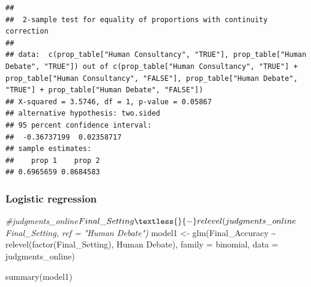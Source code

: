 \documentclass[
]{article}
\newenvironment{Shaded}{\begin{snugshade}}{\end{snugshade}}
\newcommand{\AttributeTok}[1]{\textcolor[rgb]{0.77,0.63,0.00}{#1}}
\newcommand{\CommentTok}[1]{\textcolor[rgb]{0.56,0.35,0.01}{\textit{#1}}}
\newcommand{\FunctionTok}[1]{\textcolor[rgb]{0.00,0.00,0.00}{#1}}
\newcommand{\NormalTok}[1]{#1}
\newcommand{\OtherTok}[1]{\textcolor[rgb]{0.56,0.35,0.01}{#1}}
\newcommand{\SpecialCharTok}[1]{\textcolor[rgb]{0.00,0.00,0.00}{#1}}
\newcommand{\StringTok}[1]{\textcolor[rgb]{0.31,0.60,0.02}{#1}}
\begin{document}
\begin{verbatim}
## 
##  2-sample test for equality of proportions with continuity correction
## 
## data:  c(prop_table["Human Consultancy", "TRUE"], prop_table["Human Debate", "TRUE"]) out of c(prop_table["Human Consultancy", "TRUE"] + prop_table["Human Consultancy", "FALSE"], prop_table["Human Debate", "TRUE"] + prop_table["Human Debate", "FALSE"])
## X-squared = 3.5746, df = 1, p-value = 0.05867
## alternative hypothesis: two.sided
## 95 percent confidence interval:
##  -0.36737199  0.02358717
## sample estimates:
##    prop 1    prop 2 
## 0.6965659 0.8684583
\end{verbatim}

\hypertarget{logistic-regression}{%
\subsubsection{Logistic regression}\label{logistic-regression}}

\begin{Shaded}
\begin{Highlighting}[]
\CommentTok{\#judgments\_online$Final\_Setting \textless{}{-} relevel(judgments\_online$Final\_Setting, ref = "Human Debate")}
\NormalTok{model1 }\OtherTok{\textless{}{-}} \FunctionTok{glm}\NormalTok{(Final\_Accuracy }\SpecialCharTok{\textasciitilde{}} \FunctionTok{relevel}\NormalTok{(}\FunctionTok{factor}\NormalTok{(Final\_Setting), }\StringTok{\textquotesingle{}Human Debate\textquotesingle{}}\NormalTok{), }\AttributeTok{family =} \StringTok{\textquotesingle{}binomial\textquotesingle{}}\NormalTok{, }\AttributeTok{data =}\NormalTok{ judgments\_online)}

\FunctionTok{summary}\NormalTok{(model1)}
\end{Highlighting}
\end{Shaded}
\end{document}
